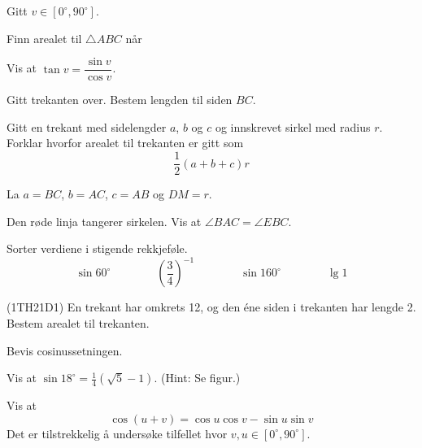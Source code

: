 




\opgt

Gitt $ v\in [0^\circ, 90^\circ] $.

Finn arealet til $ \triangle ABC $ når



Vis at $ \tan v = \dfrac{\sin v}{\cos v}  $.

\newpage
\nes

Gitt trekanten over. Bestem lengden til siden $ BC $.

Gitt en trekant med sidelengder $ a $, $ b $ og $ c $ og innskrevet sirkel med radius $ r $. Forklar hvorfor arealet til trekanten er gitt som 
\[ \frac{1}{2}(a+b+c)r \]

La $ a=BC $, $ b=AC $, $ c=AB $ og $ DM=r $.

\newpage
{}
Den røde linja tangerer sirkelen. Vis at $ \angle BAC=\angle EBC $.
\newpage

Sorter verdiene i stigende rekkjeføle.
\[ \sin 60^\circ\qquad\qquad \left(\frac{3}{4}\right)^{-1}\qquad\qquad\sin 160^\circ\qquad\qquad \lg 1\]

(1TH21D1)
En trekant har omkrets 12, og den éne siden i trekanten har lengde 2. Bestem arealet til trekanten.

Bevis cosinussetningen.

Vis at $ \sin 18^\circ=\frac{1}{4}(\sqrt{5}-1) $. (Hint: Se figur.)

Vis at
\[ \cos(u+v)= \cos u\cos v-\sin u \sin v \]
Det er tilstrekkelig å undersøke tilfellet hvor $ v,u \in [0^\circ, 90^\circ] $.




